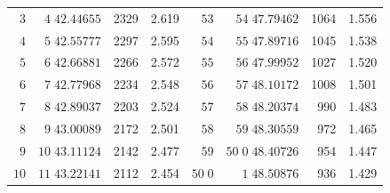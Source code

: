 \begin{center}
\begin{tabular}{|r|r|r|r||r|r|r|r|}
\(3\)&\(4\;42.44655\)&2329&2.619&\(53\)&\(54\;47.79462\)&1064&1.556\\
\(4\)&\(5\;42.55777\)&2297&2.595&\(54\)&\(55\;47.89716\)&1045&1.538\\
\(5\)&\(6\;42.66881\)&2266&2.572&\(55\)&\(56\;47.99952\)&1027&1.520\\
\(6\)&\(7\;42.77968\)&2234&2.548&\(56\)&\(57\;48.10172\)&1008&1.501\\
\(7\)&\(8\;42.89037\)&2203&2.524&\(57\)&\(58\;48.20374\)&990&1.483\\
\(8\)&\(9\;43.00089\)&2172&2.501&\(58\)&\(59\;48.30559\)&972&1.465\\
\(9\)&\(10\;43.11124\)&2142&2.477&\(59\)&\(50\;0\;48.40726\)&954&1.447\\
\(10\)&\(11\;43.22141\)&2112&2.454&\(50\;0\)&\(1\;48.50876\)&936&1.429\\
\hline
\end{tabular}
\end{center}
\endgroup

